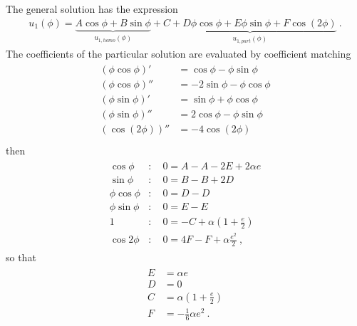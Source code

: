 \documentclass[letterpaper,10pt,english]{jupyterBook}
\begin{document}
\sphinxAtStartPar
The general solution has the expression
\begin{equation*}
\begin{split}u_1(\phi) = \underbrace{A \cos \phi + B \sin \phi}_{u_{1,homo}(\phi)} + \underbrace{C + D \phi \cos \phi + E \phi \sin \phi + F \cos (2 \phi)}_{u_{1,part}(\phi)} \ .\end{split}
\end{equation*}
\sphinxAtStartPar
The coefficients of the particular solution are evaluated by coefficient matching
\begin{equation*}
\begin{split}\begin{aligned}
  ( \phi \cos \phi )'  & =     \cos \phi - \phi \sin \phi \\
  ( \phi \cos \phi )'' & = - 2 \sin \phi - \phi \cos \phi \\
  ( \phi \sin \phi )'  & =     \sin \phi + \phi \cos \phi \\
  ( \phi \sin \phi )'' & =   2 \cos \phi - \phi \sin \phi \\
  ( \cos ( 2 \phi ))'' & = - 4 \cos ( 2 \phi ) \\
\end{aligned}\end{split}
\end{equation*}
\sphinxAtStartPar
then
\begin{equation*}
\begin{split}\begin{aligned}
      \cos \phi & : \quad 0 = A - A - 2 E + 2 \alpha e  \\
      \sin \phi & : \quad 0 = B - B + 2 D \\
 \phi \cos \phi & : \quad 0 = D - D \\
 \phi \sin \phi & : \quad 0 = E - E \\
              1 & : \quad 0 = - C + \alpha \left( 1 + \frac{e}{2} \right) \\
    \cos 2 \phi & : \quad 0 = 4 F - F + \alpha \frac{e^2}{2} \ , 
\end{aligned}\end{split}
\end{equation*}
\sphinxAtStartPar
so that
\begin{equation*}
\begin{split}\begin{aligned}
  E & = \alpha e \\
  D & = 0 \\
  C & = \alpha \left( 1 + \frac{e}{2} \right) \\
  F & = - \frac{1}{6} \alpha e^2 \ .
\end{aligned}\end{split}
\end{equation*}
\sphinxstepscope
\end{document}
